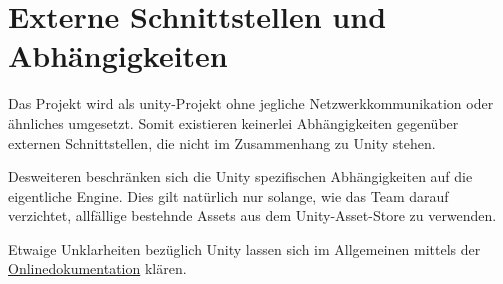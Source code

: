 \documentclass[../main.tex]{subfiles}
\begin{document}


	\section{Externe Schnittstellen und Abhängigkeiten}
	\par Das Projekt wird als \gls{unity}-Projekt ohne jegliche Netzwerkkommunikation oder ähnliches umgesetzt. Somit existieren keinerlei Abhängigkeiten gegenüber externen Schnittstellen, die nicht im Zusammenhang zu Unity stehen. 
	\par Desweiteren beschränken sich die Unity spezifischen Abhängigkeiten auf die eigentliche Engine. Dies gilt natürlich nur solange, wie das Team darauf verzichtet, allfällige bestehnde Assets aus dem Unity-Asset-Store zu verwenden.
	\par Etwaige Unklarheiten bezüglich Unity lassen sich im Allgemeinen mittels der  \href{https://docs.unity3d.com/2019.4/Documentation/ScriptReference/index.html}{Onlinedokumentation} klären.
\end{document}
